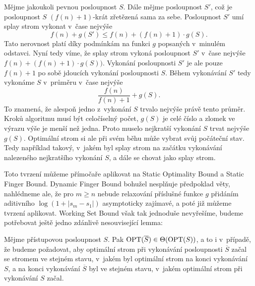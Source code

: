 \begin{dukaz}
Mějme jakoukoli pevnou posloupnost $S$. Dále mějme posloupnost $S'$, což je posloupnost $S$ $(f(n)+1)$-krát zřetězená sama za sebe. Posloupnost $S'$ umí splay strom
vykonat v~čase nejvýše $$f(n) + g(S') \leq f(n) + (f(n)+1) \cdot g(S).$$ Tato
nerovnost platí díky podmínkám na funkci $g$ popsaných v~minulém odstavci. Nyní
tedy víme, že splay strom vykoná posloupnost $S'$ v~čase nejvýše
$f(n)+(f(n)+1)\cdot g(S))$. Vykonání posloupnosti $S'$ je ale pouze $f(n)+1$ po
sobě jdoucích vykonání posloupnosti $S$. Během vykonávání $S'$ tedy vykonáme
$S$ v~průměru v~čase nejvýše $$\frac{f(n)}{f(n)+1}+g(S).$$ To znamená, že
alespoň jedno z~vykonání $S$ trvalo nejvýše právě tento průměr.
Kroků algoritmu musí být celočíselný počet, $g(S)$ je celé číslo a zlomek ve výrazu
výše je menší než jedna. Proto muselo nejkratší vykonání $S$ trvat nejvýše $g(S)$.
Optimální strom si ale při svém běhu může vybrat svůj počáteční stav. Tedy například takový, v~jakém byl splay strom na začátku
vykonávání nalezeného nejkratšího vykonání $S$, a dále se chovat jako
splay strom.
\end{dukaz}

Toto tvrzení můžeme přímočaře aplikovat na Static Optimality Bound a Static
Finger Bound. Dynamic Finger Bound bohužel nesplňuje předpoklad věty, nahlédneme ale, že pro $m\geq n$ nebude relaxování příslušné funkce $g$
přidáním aditivního $\log(1+|s_{m} - s_{1}|)$ asymptoticky zajímavé, a poté již
můžeme tvrzení aplikovat. Working Set Bound však tak jednoduše nevyřešíme,
budeme potřebovat ještě jedno zdánlivě nesouvisející lemma:

\begin{lemma}
Mějme přístupovou posloupnost $S$. Pak $\operatorname{OPT}(\overline S) \in \Theta(\operatorname{OPT}(S))$,
a to i v~případě, že budeme požadovat, aby optimální strom při vykonávání
posloupnosti $\overline{S}$ začal se stromem ve stejném stavu, v~jakém byl
optimální strom na konci vykonávání $S$, a na konci vykonávání $\overline S$ byl ve
stejném stavu, v~jakém optimální strom při vykonávání $S$ začal.  \end{lemma}

